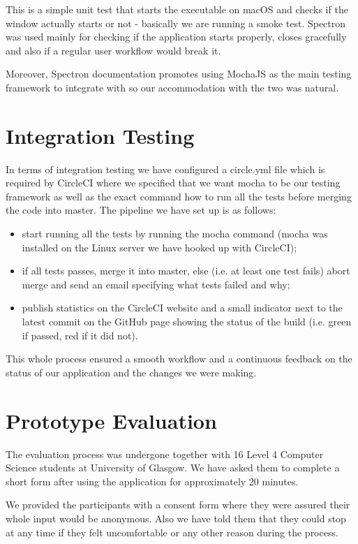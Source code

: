 \documentclass{l4proj}
\begin{document}
This is a simple unit test that starts the executable on macOS and checks if the window actually starts or not -
basically we are running a smoke test. Spectron was used mainly for checking if the application starts properly,
closes gracefully and also if a regular user workflow would break it.

Moreover, Spectron documentation promotes using MochaJS as the main testing framework to integrate with so our
accommodation with the two was natural.

\section{Integration Testing}

In terms of integration testing we have configured a circle.yml file which is required by CircleCI where we specified
that we want mocha to be our testing framework as well as the exact command how to run all the tests before merging
the code into master. The pipeline we have set up is as follows:

\begin{itemize}
  \item start running all the tests by running the mocha command (mocha was installed on the Linux server we have hooked
    up with CircleCI);
    \item if all tests passes, merge it into master, else (i.e. at least one test fails) abort merge and send an email specifying what tests failed and why;
  \item publish statistics on the CircleCI website and a small indicator next to the latest commit on the GitHub page
    showing the status of the build
    (i.e. green if passed, red if it did not).
\end{itemize}

This whole process ensured a smooth workflow and a continuous feedback on the status of our application and the
changes we were making.

\section{Prototype Evaluation}

The evaluation process was undergone together with 16 Level 4 Computer Science students at University of Glasgow. We
have asked them to complete a short form after using the application for approximately 20 minutes.

We provided the participants with a consent form where they were assured their whole input would be anonymous.
Also we have told them that they could stop at any time if they felt uncomfortable or any other reason during the
process.
\end{document}
